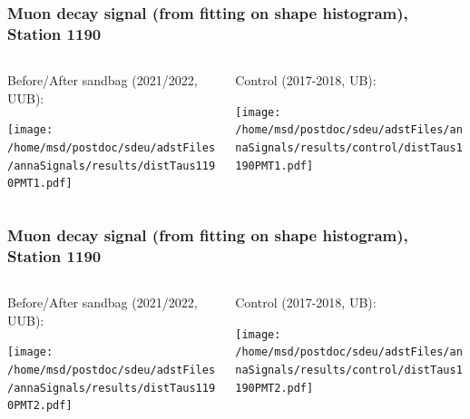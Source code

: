 \documentclass[aspectratio=169]{beamer}
\begin{document}
\begin{frame}
  \frametitle{Muon decay signal (from fitting on shape histogram), Station 1190}
  
  \begin{columns}[T,c]
    \begin{column}{.5\textwidth}
      Before/After sandbag (2021/2022, UUB):
      \vspace{.3cm}

      \texttt{[image: /home/msd/postdoc/sdeu/adstFiles/annaSignals/results/distTaus1190PMT1.pdf]}
    \end{column}
    \begin{column}{.5\textwidth}
      Control (2017-2018, UB):
      \vspace{0.3cm}

      \texttt{[image: /home/msd/postdoc/sdeu/adstFiles/annaSignals/results/control/distTaus1190PMT1.pdf]}
    \end{column}
  \end{columns}
\end{frame}

\begin{frame}
  \frametitle{Muon decay signal (from fitting on shape histogram), Station 1190}
  
  \begin{columns}[T,c]
    \begin{column}{.5\textwidth}
      Before/After sandbag (2021/2022, UUB):
      \vspace{.3cm}

      \texttt{[image: /home/msd/postdoc/sdeu/adstFiles/annaSignals/results/distTaus1190PMT2.pdf]}
    \end{column}
    \begin{column}{.5\textwidth}
      Control  (2017-2018, UB):
      \vspace{0.3cm}

      \texttt{[image: /home/msd/postdoc/sdeu/adstFiles/annaSignals/results/control/distTaus1190PMT2.pdf]}
    \end{column}    
\end{columns}
\end{frame}
\end{document}
